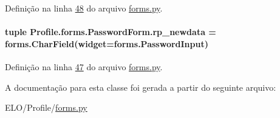 Definição na linha \hyperlink{Profile_2forms_8py_source_l00048}{48} do arquivo \hyperlink{Profile_2forms_8py_source}{forms.\+py}.

\hypertarget{classProfile_1_1forms_1_1PasswordForm_a7560db05a7e3dfebdd4e95385192b2ad}{}
\paragraph[{rp\+\_\+newdata}]{\setlength{\rightskip}{0pt plus 5cm}tuple Profile.\+forms.\+Password\+Form.\+rp\+\_\+newdata = forms.\+Char\+Field(widget=forms.\+Password\+Input)\hspace{0.3cm}{\ttfamily [static]}}\label{classProfile_1_1forms_1_1PasswordForm_a7560db05a7e3dfebdd4e95385192b2ad}


Definição na linha \hyperlink{Profile_2forms_8py_source_l00047}{47} do arquivo \hyperlink{Profile_2forms_8py_source}{forms.\+py}.



A documentação para esta classe foi gerada a partir do seguinte arquivo\+:\begin{DoxyCompactItemize}
\item 
E\+L\+O/\+Profile/\hyperlink{Profile_2forms_8py}{forms.\+py}\end{DoxyCompactItemize}
